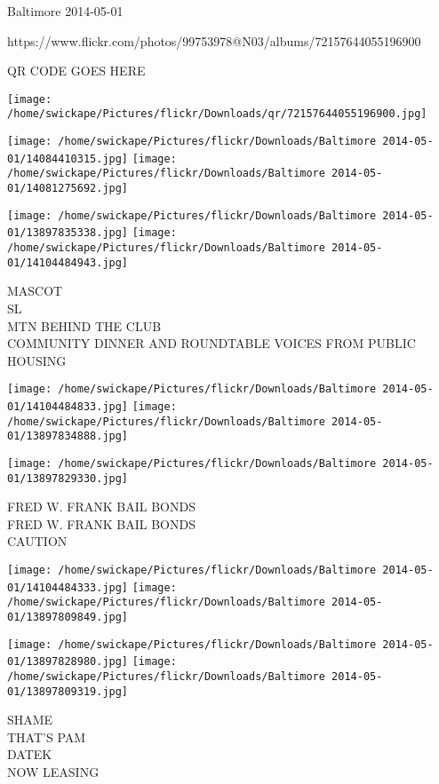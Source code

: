 \documentclass[10pt,letterpaper]{article}
\begin{document}
Baltimore 2014-05-01

https://www.flickr.com/photos/99753978@N03/albums/72157644055196900

QR CODE GOES HERE

\texttt{[image: /home/swickape/Pictures/flickr/Downloads/qr/72157644055196900.jpg]}
\pagebreak

\texttt{[image: /home/swickape/Pictures/flickr/Downloads/Baltimore 2014-05-01/14084410315.jpg]}
\texttt{[image: /home/swickape/Pictures/flickr/Downloads/Baltimore 2014-05-01/14081275692.jpg]}

\texttt{[image: /home/swickape/Pictures/flickr/Downloads/Baltimore 2014-05-01/13897835338.jpg]}
\texttt{[image: /home/swickape/Pictures/flickr/Downloads/Baltimore 2014-05-01/14104484943.jpg]}

MASCOT\\
SL\\
MTN BEHIND THE CLUB\\
COMMUNITY DINNER AND ROUNDTABLE VOICES FROM PUBLIC HOUSING\\
\pagebreak

\texttt{[image: /home/swickape/Pictures/flickr/Downloads/Baltimore 2014-05-01/14104484833.jpg]}
\texttt{[image: /home/swickape/Pictures/flickr/Downloads/Baltimore 2014-05-01/13897834888.jpg]}

\vspace{0.25in}
\texttt{[image: /home/swickape/Pictures/flickr/Downloads/Baltimore 2014-05-01/13897829330.jpg]}

FRED W. FRANK BAIL BONDS\\
FRED W. FRANK BAIL BONDS\\
CAUTION\\
\pagebreak

\texttt{[image: /home/swickape/Pictures/flickr/Downloads/Baltimore 2014-05-01/14104484333.jpg]}
\texttt{[image: /home/swickape/Pictures/flickr/Downloads/Baltimore 2014-05-01/13897809849.jpg]}

\texttt{[image: /home/swickape/Pictures/flickr/Downloads/Baltimore 2014-05-01/13897828980.jpg]}
\texttt{[image: /home/swickape/Pictures/flickr/Downloads/Baltimore 2014-05-01/13897809319.jpg]}

SHAME\\
THAT'S PAM\\
DATEK\\
NOW LEASING\\
\pagebreak
\end{document}

